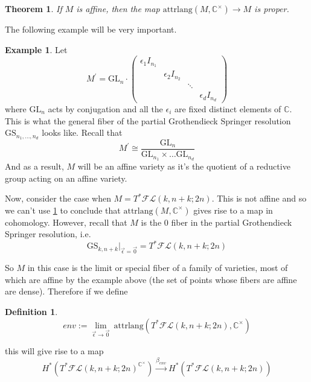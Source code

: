 \documentclass[12pt]{amsart}
\numberwithin{equation}{section}
\newtheorem{Theorem}[equation]{Theorem}
\theoremstyle{definition}
\newtheorem{Example}[equation]{Example}
\newtheorem{Definition}[equation]{Definition}
\numberwithin{figure}{section}
\newcommand{\C}{\mathbb{C}}
\newcommand{\fl}{\mathcal{FL}}
\newcommand{\gl}{\mathrm{GL}}
\newcommand{\attrl}{\mathrm{attrlang}}
\begin{document}
\begin{Theorem}
\label{affinetheorem}
If $M$ is affine, then the map $\attrl(M, \C^\times)\to M$ is proper.
\end{Theorem}

The following example will be very important. 

\begin{Example}
Let 
$$M^\prime=\mathrm{GL}_n\cdot\begin{pmatrix}
\epsilon_1 I_{n_1} &  &  &  \\
& \epsilon_2 I_{n_2} & & \\
 &  & \ddots &  \\
 &  &  & \epsilon_d I_{n_d}
\end{pmatrix}$$ where $\mathrm{GL}_n$ acts by conjugation and all the $\epsilon_i$ are fixed distinct elements of $\C$. This is what the general fiber of the partial Grothendieck Springer resolution $\mathrm{GS}_{n_1, \ldots, n_d}$ looks like. Recall that
\[ M^\prime\cong \frac{\gl_n}{\gl_{n_1}\times \ldots \gl_{n_d}} \]
And as a result, $M$ will be an affine variety as it's the quotient of a reductive group acting on an affine variety. 
\end{Example}

Now, consider the case when $M=T^*\fl(k, n+k; 2n)$. This is not affine and so we can't use \cref{affinetheorem} to conclude that $\attrl(M, \C^\times)$ gives rise to a map in cohomology. However, recall that $M$ is the 0 fiber in the partial Grothendieck Springer resolution, i.e.
\[  \mathrm{GS}_{k, n+k}|_{\vec{\epsilon}=\vec{0}} = T^*\fl(k, n+k; 2n) \]

So $M$ in this case is the limit or special fiber of a family of varieties, most of which are affine by the example above (the set of points whose fibers are affine are dense). Therefore if we define 
\begin{Definition}
\[ env:=\lim_{\vec{\epsilon}\to \vec{0}} \  \attrl(T^*\fl(k, n+k; 2n), \C^\times ) \]
\end{Definition}
this will give rise to a map
\[ H^*(T^*\fl(k, n+k; 2n)^{\C^\times})\xrightarrow{\beta_{env}} H^*(T^*\fl(k, n+k; 2n)) \]
\end{document}
